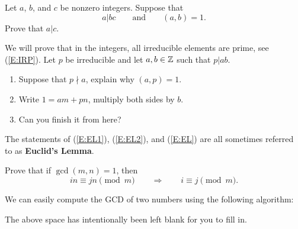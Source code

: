 \documentclass{ximera}
\begin{document}
\begin{corollary}\label{E:EL2} 
  Let $a$, $b$, and $c$ be nonzero integers. Suppose that 
  \[
  a |bc\qquad\text{and}\qquad (a,b)=1.
  \]
  Prove that $a|c$. 
\end{corollary}



\begin{corollary}\label{E:EL} 
  We will prove that in the integers, all irreducible elements are
  prime, see (\ref{E:IRP}). Let $p$ be irreducible and let $a,b\in \mathbb Z$
  such that $p|ab$.
  \begin{enumerate}
  \item Suppose that $p\nmid a$, explain why $(a,p) =1$.
  \item Write $1 = am + pn$, multiply both sides by $b$.
  \item Can you finish it from here?
  \end{enumerate}
\end{corollary}



The statements of (\ref{E:EL1}), (\ref{E:EL2}), and (\ref{E:EL}) are
all sometimes referred to as \textbf{Euclid's Lemma}.



\begin{exercise} Prove that if $\gcd(m,n) = 1$, then 
\[
in \equiv jn \pmod m \qquad \Rightarrow\qquad i\equiv j\pmod m.
\]
\end{exercise}




\begin{theorem} 
We can easily compute the GCD of two numbers using the following
algorithm:
\vspace{2in}

\end{theorem}
\noindent The above space has intentionally been left blank for you to
fill in.
\end{document}
